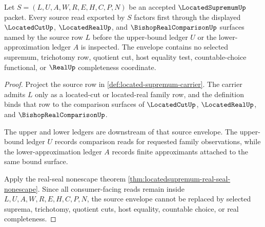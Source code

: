 \begin{theorem}
\label{thm:located-supremum-source-envelope}
Let $S=(L,U,A,W,R,E,H,C,P,N)$ be an accepted $\LocatedSupremumUp$ packet. Every source read exported by $S$ factors first through the displayed $\LocatedCutUp$, $\LocatedRealUp$, and $\BishopRealComparisonUp$ surfaces named by the source row $L$ before the upper-bound ledger $U$ or the lower-approximation ledger $A$ is inspected. The envelope contains no selected supremum, trichotomy row, quotient cut, host equality test, countable-choice functional, or $\RealUp$ completeness coordinate.
\end{theorem}
\begin{proof}
Project the source row in \autoref{def:located-supremum-carrier}. The carrier admits $L$ only as a located-cut or located-real family row, and the definition binds that row to the comparison surfaces of $\LocatedCutUp$, $\LocatedRealUp$, and $\BishopRealComparisonUp$.

The upper and lower ledgers are downstream of that source envelope. The upper-bound ledger $U$ records comparison reads for requested family observations, while the lower-approximation ledger $A$ records finite approximants attached to the same bound surface.

Apply the real-seal nonescape theorem \autoref{thm:locatedsupremum-real-seal-nonescape}. Since all consumer-facing reads remain inside $L,U,A,W,R,E,H,C,P,N$, the source envelope cannot be replaced by selected suprema, trichotomy, quotient cuts, host equality, countable choice, or real completeness.
\end{proof}

